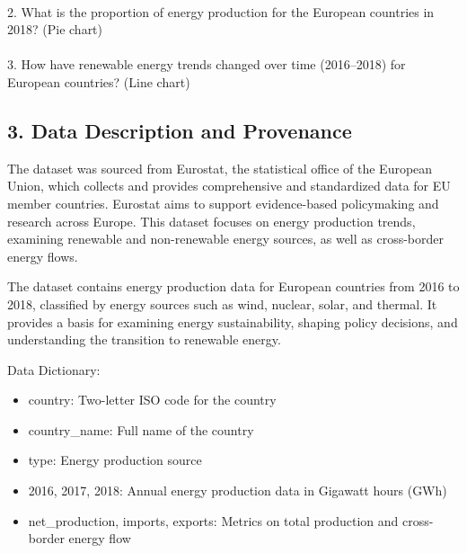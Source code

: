 \documentclass[
  letterpaper,
  DIV=11,
  numbers=noendperiod]{scrartcl}
\makeatletter
\let\oldparagraph\paragraph
\renewcommand{\paragraph}{
    \@ifstar
      \xxxParagraphStar
      \xxxParagraphNoStar
  }
\newcommand{\xxxParagraphStar}[1]{\oldparagraph*{#1}\mbox{}}
\newcommand{\xxxParagraphNoStar}[1]{\oldparagraph{#1}\mbox{}}
\makeatother
\begin{document}
\paragraph{2. What is the proportion of energy production for the
European countries in 2018? (Pie
chart)}\label{what-is-the-proportion-of-energy-production-for-the-european-countries-in-2018-pie-chart}

\paragraph{3. How have renewable energy trends changed over time
(2016--2018) for European countries? (Line
chart)}\label{how-have-renewable-energy-trends-changed-over-time-20162018-for-european-countries-line-chart}

\subsection{3. Data Description and
Provenance}\label{data-description-and-provenance}

The dataset was sourced from Eurostat, the statistical office of the
European Union, which collects and provides comprehensive and
standardized data for EU member countries. Eurostat aims to support
evidence-based policymaking and research across Europe. This dataset
focuses on energy production trends, examining renewable and
non-renewable energy sources, as well as cross-border energy flows.

The dataset contains energy production data for European countries from
2016 to 2018, classified by energy sources such as wind, nuclear, solar,
and thermal. It provides a basis for examining energy sustainability,
shaping policy decisions, and understanding the transition to renewable
energy.

Data Dictionary:

\begin{itemize}
\item
  country: Two-letter ISO code for the country
\item
  country\_name: Full name of the country
\item
  type: Energy production source
\item
  2016, 2017, 2018: Annual energy production data in Gigawatt hours
  (GWh)
\item
  net\_production, imports, exports: Metrics on total production and
  cross-border energy flow
\end{itemize}
\end{document}
